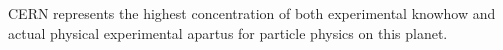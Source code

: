 CERN represents the highest concentration of both experimental knowhow and
actual physical experimental apartus for particle physics on this planet.

